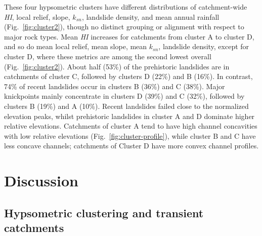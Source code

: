 \documentclass[draft]{agujournal2019}
\begin{document}
\par These four hypsometric clusters have different distributions of catchment-wide \textit{HI}, local relief, slope, $k_{sn}$, landslide density, and mean annual rainfall (Fig.~\ref{fig:cluster2}), though no distinct grouping or alignment with respect to major rock types. Mean \textit{HI} increases for catchments from cluster A to cluster D, and so do mean local relief, mean slope, mean $k_{sn}$, landslide density, except for cluster D, where these metrics are among the second lowest overall (Fig.~\ref{fig:cluster2}). About half (53\%) of the prehistoric landslides are in catchments of cluster C, followed by clusters D (22\%) and B (16\%). In contrast, 74\% of recent landslides occur in clusters B (36\%) and C (38\%). Major knickpoints mainly concentrate in clusters D (39\%) and C (32\%), followed by clusters B (19\%) and A (10\%). Recent landslides failed close to the normalized elevation peaks, whilst prehistoric landslides in cluster A and D dominate higher relative elevations. Catchments of cluster A tend to have high channel concavities with low relative elevations (Fig.~\ref{fig:cluster-profile}), while cluster B and C have less concave channels; catchments of Cluster D have more convex channel profiles.


\section{Discussion}

\subsection{Hypsometric clustering and transient catchments}
\end{document}
